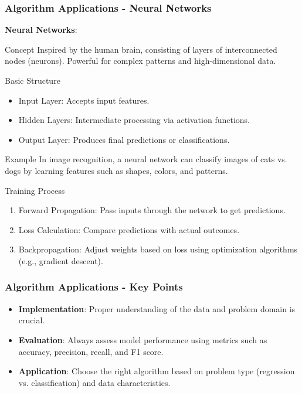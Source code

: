 \documentclass[aspectratio=169]{beamer}
\begin{document}
\begin{frame}[fragile]
    \frametitle{Algorithm Applications - Neural Networks}
    \textbf{Neural Networks}:
    \begin{block}{Concept}
        Inspired by the human brain, consisting of layers of interconnected nodes (neurons). Powerful for complex patterns and high-dimensional data.
    \end{block}
    
    \begin{block}{Basic Structure}
        \begin{itemize}
            \item Input Layer: Accepts input features.
            \item Hidden Layers: Intermediate processing via activation functions.
            \item Output Layer: Produces final predictions or classifications.
        \end{itemize}
    \end{block}
    
    \begin{block}{Example}
        In image recognition, a neural network can classify images of cats vs. dogs by learning features such as shapes, colors, and patterns.
    \end{block}
    
    \begin{block}{Training Process}
        \begin{enumerate}
            \item Forward Propagation: Pass inputs through the network to get predictions.
            \item Loss Calculation: Compare predictions with actual outcomes.
            \item Backpropagation: Adjust weights based on loss using optimization algorithms (e.g., gradient descent).
        \end{enumerate}
    \end{block}
\end{frame}

\begin{frame}[fragile]
    \frametitle{Algorithm Applications - Key Points}
    \begin{itemize}
        \item \textbf{Implementation}: Proper understanding of the data and problem domain is crucial.
        \item \textbf{Evaluation}: Always assess model performance using metrics such as accuracy, precision, recall, and F1 score.
        \item \textbf{Application}: Choose the right algorithm based on problem type (regression vs. classification) and data characteristics.
    \end{itemize}
\end{frame}
\end{document}

